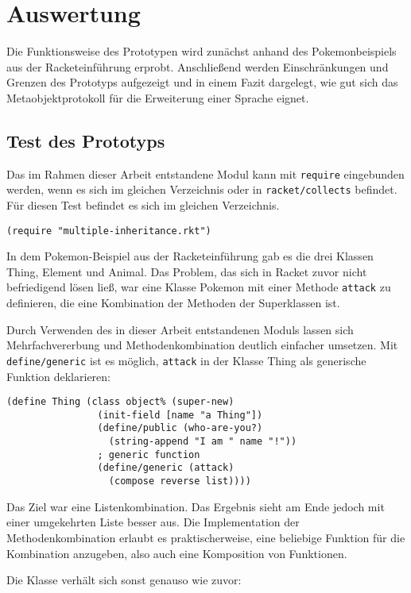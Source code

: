 \chapter{Auswertung}
Die Funktionsweise des Prototypen wird zunächst anhand des Pokemonbeispiels aus der Racketeinführung erprobt. Anschließend werden Einschränkungen und Grenzen des Prototyps aufgezeigt und in einem Fazit dargelegt, wie gut sich das Metaobjektprotokoll für die Erweiterung einer Sprache eignet.

\section{Test des Prototyps}
Das im Rahmen dieser Arbeit entstandene Modul kann mit \texttt{require} eingebunden werden, wenn es sich im gleichen Verzeichnis oder in \texttt{racket/collects} befindet. Für diesen Test befindet es sich im gleichen Verzeichnis.

\begin{lstlisting}
(require "multiple-inheritance.rkt")
\end{lstlisting}

In dem Pokemon-Beispiel aus der Racketeinführung gab es die drei Klassen Thing, Element und Animal. Das Problem, das sich in Racket zuvor nicht befriedigend lösen ließ, war eine Klasse Pokemon mit einer Methode \texttt{attack} zu definieren, die eine Kombination der Methoden der Superklassen ist. 

Durch Verwenden des in dieser Arbeit entstandenen Moduls lassen sich Mehrfachvererbung und Methodenkombination deutlich einfacher umsetzen. Mit \texttt{define/generic} ist es möglich, \texttt{attack} in der Klasse Thing als generische Funktion deklarieren:

\begin{lstlisting}
(define Thing (class object% (super-new)
                (init-field [name "a Thing"])
                (define/public (who-are-you?)
                  (string-append "I am " name "!"))
                ; generic function
                (define/generic (attack)
                  (compose reverse list))))
\end{lstlisting}

Das Ziel war eine Listenkombination. Das Ergebnis sieht am Ende jedoch mit einer umgekehrten Liste besser aus. Die Implementation der Methodenkombination erlaubt es praktischerweise, eine beliebige Funktion für die Kombination anzugeben, also auch eine Komposition von Funktionen.

Die Klasse verhält sich sonst genauso wie zuvor:

